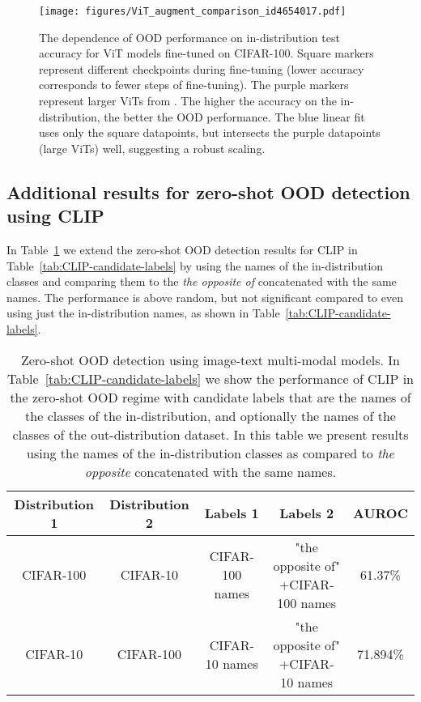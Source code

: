\documentclass{article}
\begin{document}
\begin{figure}[ht]
	\centering
\texttt{[image: figures/ViT\_augment\_comparison\_id4654017.pdf]}
	\vspace{-0.5em}
	\caption{The dependence of OOD performance on in-distribution test accuracy for ViT models fine-tuned on CIFAR-100. Square markers represent different checkpoints during fine-tuning (lower accuracy corresponds to fewer steps of fine-tuning). 
The purple markers represent larger ViTs from \citet{steiner2021augreg}. The higher the accuracy on the in-distribution, the better the OOD performance. The blue linear fit uses only the square datapoints, but intersects the purple datapoints (large ViTs) well, suggesting a robust scaling.}
	\vspace{-1em}
	\label{fig:ViT_and_Mixer_scaling}
\end{figure}



\subsection{Additional results for zero-shot OOD detection using CLIP}

In Table~\ref{tab:CLIP-candidate-labels-opposites} we extend the zero-shot OOD detection results for CLIP in Table~\ref{tab:CLIP-candidate-labels} by using the names of the in-distribution classes and comparing them to the \textit{the opposite of} concatenated with the same names. The performance is above random, but not significant compared to even using just the in-distribution names, as shown in Table~\ref{tab:CLIP-candidate-labels}.

\begin{table}[ht]
\begin{center}	
\vspace{-1em}
\caption{Zero-shot OOD detection using image-text multi-modal models. In Table~\ref{tab:CLIP-candidate-labels} we show the performance of CLIP in the zero-shot OOD regime with candidate labels that are the names of the classes of the in-distribution, and optionally the names of the classes of the out-distribution dataset. In this table we present results using the names of the in-distribution classes as compared to \textit{the opposite} concatenated with the same names.
}
\vspace{0.5em}
\begin{tabular}{ c|c|c|c|c } 
	Distribution 1 & Distribution 2 & Labels 1 & Labels 2 & AUROC \\
	\hline
		CIFAR-100 & CIFAR-10 & CIFAR-100 names & \makecell{"the opposite of"\\+CIFAR-100 names} & 61.37\% \\
				CIFAR-10 & CIFAR-100 & CIFAR-10 names & \makecell{"the opposite of"\\+CIFAR-10 names}  & 71.894\% \\
\hline
\end{tabular}
\vspace{-1em}
\label{tab:CLIP-candidate-labels-opposites}
\end{center}
\end{table}
\end{document}
